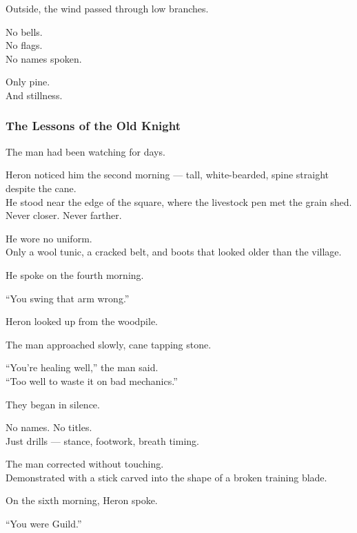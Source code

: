 \documentclass[12pt]{article}
\begin{document}
\vspace{1em}

Outside, the wind passed through low branches.

No bells.\\
No flags.\\
No names spoken.

Only pine.\\
And stillness.

\dotfill

\subsubsection*{The Lessons of the Old Knight}

The man had been watching for days.

Heron noticed him the second morning — tall, white-bearded, spine straight despite the cane.\\
He stood near the edge of the square, where the livestock pen met the grain shed.\\
Never closer. Never farther.

He wore no uniform.\\
Only a wool tunic, a cracked belt, and boots that looked older than the village.

He spoke on the fourth morning.

\vspace{1em}

“You swing that arm wrong.”

Heron looked up from the woodpile.

The man approached slowly, cane tapping stone.

“You're healing well,” the man said.\\
“Too well to waste it on bad mechanics.”

\vspace{1em}

They began in silence.

No names. No titles.\\
Just drills — stance, footwork, breath timing.

The man corrected without touching.\\
Demonstrated with a stick carved into the shape of a broken training blade.

\vspace{1em}

On the sixth morning, Heron spoke.

“You were Guild.”
\end{document}
